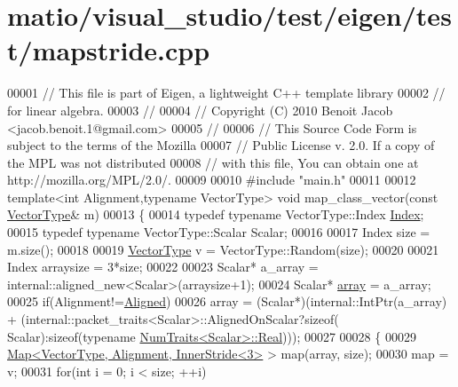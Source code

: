\hypertarget{matio_2visual__studio_2test_2eigen_2test_2mapstride_8cpp_source}{}\section{matio/visual\+\_\+studio/test/eigen/test/mapstride.cpp}
\label{matio_2visual__studio_2test_2eigen_2test_2mapstride_8cpp_source}

\begin{DoxyCode}
00001 \textcolor{comment}{// This file is part of Eigen, a lightweight C++ template library}
00002 \textcolor{comment}{// for linear algebra.}
00003 \textcolor{comment}{//}
00004 \textcolor{comment}{// Copyright (C) 2010 Benoit Jacob <jacob.benoit.1@gmail.com>}
00005 \textcolor{comment}{//}
00006 \textcolor{comment}{// This Source Code Form is subject to the terms of the Mozilla}
00007 \textcolor{comment}{// Public License v. 2.0. If a copy of the MPL was not distributed}
00008 \textcolor{comment}{// with this file, You can obtain one at http://mozilla.org/MPL/2.0/.}
00009 
00010 \textcolor{preprocessor}{#include "main.h"}
00011 
00012 \textcolor{keyword}{template}<\textcolor{keywordtype}{int} Alignment,\textcolor{keyword}{typename} VectorType> \textcolor{keywordtype}{void} map\_class\_vector(\textcolor{keyword}{const} 
      \hyperlink{struct_vector_type}{VectorType}& m)
00013 \{
00014   \textcolor{keyword}{typedef} \textcolor{keyword}{typename} VectorType::Index \hyperlink{namespace_eigen_a62e77e0933482dafde8fe197d9a2cfde}{Index};
00015   \textcolor{keyword}{typedef} \textcolor{keyword}{typename} VectorType::Scalar Scalar;
00016 
00017   Index size = m.size();
00018 
00019   \hyperlink{struct_vector_type}{VectorType} v = VectorType::Random(size);
00020 
00021   Index arraysize = 3*size;
00022   
00023   Scalar* a\_array = internal::aligned\_new<Scalar>(arraysize+1);
00024   Scalar* \hyperlink{class_eigen_1_1array}{array} = a\_array;
00025   \textcolor{keywordflow}{if}(Alignment!=\hyperlink{group__enums_gga45fe06e29902b7a2773de05ba27b47a1ad37d4c71425bb286e9b4103830538fbf}{Aligned})
00026     array = (Scalar*)(internal::IntPtr(a\_array) + (internal::packet\_traits<Scalar>::AlignedOnScalar?\textcolor{keyword}{sizeof}(
      Scalar):\textcolor{keyword}{sizeof}(\textcolor{keyword}{typename} \hyperlink{group___core___module_struct_eigen_1_1_num_traits}{NumTraits<Scalar>::Real})));
00027 
00028   \{
00029     \hyperlink{group___core___module_class_eigen_1_1_map}{Map<VectorType, Alignment, InnerStride<3>} > map(array, size);
00030     map = v;
00031     \textcolor{keywordflow}{for}(\textcolor{keywordtype}{int} i = 0; i < size; ++i)

\end{DoxyCode}
